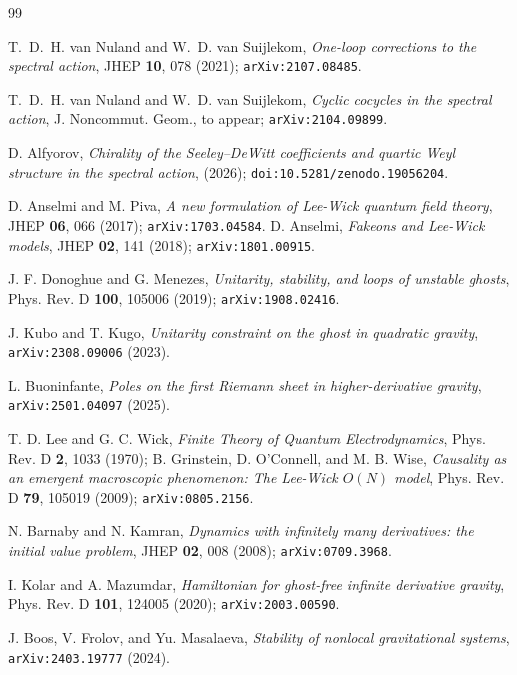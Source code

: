 \documentclass[11pt,a4paper]{article}
\begin{document}
\begin{thebibliography}{99}

T.~D.~H. van Nuland and W.~D. van Suijlekom,
\textit{One-loop corrections to the spectral action},
JHEP \textbf{10}, 078 (2021);
\texttt{arXiv:2107.08485}.

T.~D.~H. van Nuland and W.~D. van Suijlekom,
\textit{Cyclic cocycles in the spectral action},
J. Noncommut. Geom., to appear;
\texttt{arXiv:2104.09899}.

D. Alfyorov,
\textit{Chirality of the Seeley--DeWitt coefficients and quartic Weyl
structure in the spectral action},
(2026); \texttt{doi:10.5281/zenodo.19056204}.

D. Anselmi and M. Piva,
\textit{A new formulation of Lee-Wick quantum field theory},
JHEP \textbf{06}, 066 (2017);
\texttt{arXiv:1703.04584}.
%
D. Anselmi,
\textit{Fakeons and Lee-Wick models},
JHEP \textbf{02}, 141 (2018);
\texttt{arXiv:1801.00915}.

J. F. Donoghue and G. Menezes,
\textit{Unitarity, stability, and loops of unstable ghosts},
Phys. Rev. D \textbf{100}, 105006 (2019);
\texttt{arXiv:1908.02416}.

J. Kubo and T. Kugo,
\textit{Unitarity constraint on the ghost in quadratic gravity},
\texttt{arXiv:2308.09006} (2023).

L. Buoninfante,
\textit{Poles on the first Riemann sheet in higher-derivative gravity},
\texttt{arXiv:2501.04097} (2025).

T. D. Lee and G. C. Wick,
\textit{Finite Theory of Quantum Electrodynamics},
Phys. Rev. D \textbf{2}, 1033 (1970);
%
B. Grinstein, D. O'Connell, and M. B. Wise,
\textit{Causality as an emergent macroscopic phenomenon:
The Lee-Wick $O(N)$ model},
Phys. Rev. D \textbf{79}, 105019 (2009);
\texttt{arXiv:0805.2156}.

N. Barnaby and N. Kamran,
\textit{Dynamics with infinitely many derivatives:
the initial value problem},
JHEP \textbf{02}, 008 (2008);
\texttt{arXiv:0709.3968}.

I. Kolar and A. Mazumdar,
\textit{Hamiltonian for ghost-free infinite derivative gravity},
Phys. Rev. D \textbf{101}, 124005 (2020);
\texttt{arXiv:2003.00590}.

J. Boos, V. Frolov, and Yu. Masalaeva,
\textit{Stability of nonlocal gravitational systems},
\texttt{arXiv:2403.19777} (2024).


\end{thebibliography}
\end{document}
